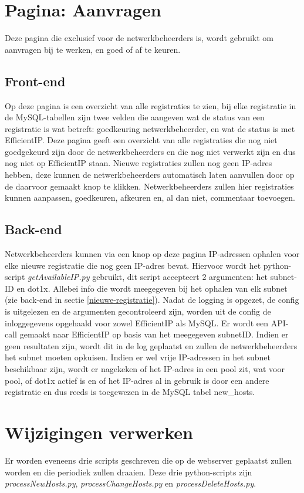 \section{Pagina: Aanvragen}
\label{aanvragen}
Deze pagina die exclusief voor de netwerkbeheerders is, wordt gebruikt om aanvragen bij te werken, en goed of af te keuren.

\subsection{Front-end}
Op deze pagina is een overzicht van alle registraties te zien, bij elke registratie in de MySQL-tabellen zijn twee velden die aangeven wat de status van een registratie is wat betreft: goedkeuring netwerkbeheerder, en wat de status is met EfficientIP. Deze pagina geeft een overzicht van alle registraties die nog niet goedgekeurd zijn door de netwerkbeheerders en die nog niet verwerkt zijn en dus nog niet op EfficientIP staan. Nieuwe registraties zullen nog geen IP-adres hebben, deze kunnen de netwerkbeheerders automatisch laten aanvullen door op de daarvoor gemaakt knop te klikken.
Netwerkbeheerders zullen hier registraties kunnen aanpassen, goedkeuren, afkeuren en, al dan niet, commentaar toevoegen.

\subsection{Back-end}
Netwerkbeheerders kunnen via een knop op deze pagina IP-adressen ophalen voor elke nieuwe registratie die nog geen IP-adres bevat.
Hiervoor wordt het python-script \textit{getAvailableIP.py} gebruikt, dit script accepteert 2 argumenten: het subnet-ID  en dot1x. Allebei info die wordt meegegeven bij het ophalen van elk subnet (zie back-end in sectie \ref{nieuwe-registratie}). Nadat de logging is opgezet, de config is uitgelezen en de argumenten gecontroleerd zijn, worden uit de config de inloggegevens opgehaald voor zowel EfficientIP als MySQL. Er wordt een API-call gemaakt naar EfficientIP op basis van het meegegeven subnetID. Indien er geen resultaten zijn, wordt dit in de log geplaatst en zullen de netwerkbeheerders het subnet moeten opkuisen.
Indien er wel vrije IP-adressen in het subnet beschikbaar zijn, wordt er nagekeken of het IP-adres in een pool zit, wat voor pool, of dot1x actief is en of het IP-adres al in gebruik is door een andere registratie en dus reeds is toegewezen in de MySQL tabel new\_hosts.

\section{Wijzigingen verwerken}
\label{wijzigingen-verwerken}
Er worden eveneens drie scripts geschreven die op de webserver geplaatst zullen worden en die periodiek zullen draaien.
Deze drie python-scripts zijn \textit{processNewHosts.py}, \textit{processChangeHosts.py} en \textit{processDeleteHosts.py}.

